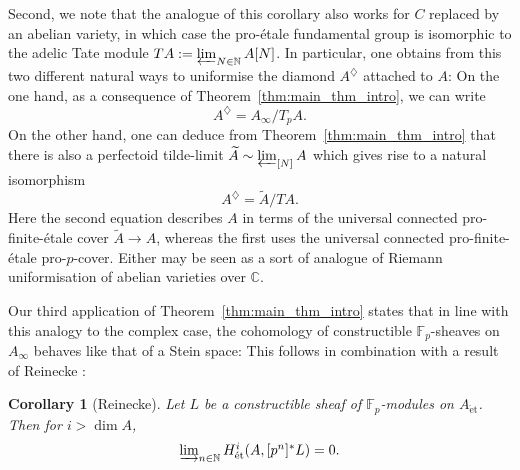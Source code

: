 \documentclass[10pt,oneside]{amsart}
\newtheorem{corollary}[theorem]{Corollary}
\theoremstyle{definition}
\newtheorem{question}[theorem]{Question}
\newtheorem{example}[theorem]{Example}
\newcommand{\et}{\operatorname{\acute{e}t}}
\newcommand{\N}{\mathbb{N}}
\newcommand{\C}{\mathbb{C}}
\newcommand{\F}{\mathbb{F}}
\begin{document}
Second, we note that the analogue of this corollary also works for $C$ replaced by an abelian variety, in which case the pro-\'etale fundamental group is isomorphic to the adelic Tate module $TA:=\varprojlim_{N\in \N}A[N]$. In particular, one obtains from this two different natural ways to uniformise the diamond $A^{\diamondsuit}$ attached to $A$: On the one hand, as a consequence of Theorem~\ref{thm:main_thm_intro}, we can write
\[ A^{\diamondsuit}=A_\infty/T_pA.\]
On the other hand, one can deduce from Theorem~\ref{thm:main_thm_intro} that there is also a perfectoid tilde-limit $\widetilde{A}\sim \varprojlim_{[N]} A$ which gives rise to a natural isomorphism
\[ A^{\diamondsuit}=\widetilde{A}/T A.\]
Here the second equation describes $A$ in terms of the universal connected pro-finite-\'etale cover $\widetilde{A}\to A$, whereas the first uses the universal connected pro-finite-\'etale pro-$p$-cover.
Either may be seen as a sort of analogue of Riemann uniformisation of abelian varieties over $\C$. 

Our third application of Theorem~\ref{thm:main_thm_intro} states that in line with this analogy to the complex case, the cohomology of constructible $\F_p$-sheaves on $A_\infty$ behaves like that of a Stein space: This follows in combination with a result of Reinecke \cite{Reinecke}:
\begin{corollary}[Reinecke]
	Let $L$ be a constructible sheaf of $\mathbb F_p$-modules on $A_{\et}$. Then for $i>\dim A$,
	\[\textstyle\varinjlim_{n\in \mathbb N}H_{\et}^i(A,[p^n]^{\ast}L)=0.\]
\end{corollary}

 \begin{comment}
Now we end the introduction by describing the content of each section. 

	\begin{question} \label{question_intro}
	    \begin{enumerate} 
	    \item		Given a rigid group $G$, when is there an adic space $G_\infty$ such that $G_\infty \sim  \varprojlim_{[p]} G ?$
	    \item If it exists, and $K$ is perfectoid, when is $G_\infty$ perfectoid?
	    \end{enumerate}
	\end{question}
 
 
	But before we give proofs for examples of rigid groups $G$ for which a perfectoid tilde-limit exists, we first note that the second question certainly doesn't have an affirmative answer for all rigid group varieties:
	\begin{example}
		For the additive group $\mathbb G_a^{\operatorname{an}}$, we know that $[p]$ is an isomorphism and therefore $\varprojlim_{[p]} \mathbb G_a=\mathbb G_a$ exists (even as an actual limit in the category of adic spaces) but is certainly not perfectoid.
	\end{example}

\end{comment} 
 
\end{document}
